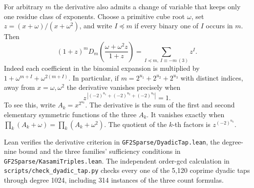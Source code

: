 \documentclass[11pt]{article}
\begin{document}
For arbitrary \(m\) the derivative also admits a change of variable
that keeps only one residue class of exponents. Choose a primitive
cube root \(\omega\), set \(z=(x+\omega)/(x+\omega^2)\), and write
\(I\preceq m\) if every binary one of \(I\) occurs in \(m\). Then
\[
 (1+z)^m D_m\!\left(\frac{\omega+\omega^2z}{1+z}\right)
      =\sum_{I\preceq m,\ I\equiv-m\ (3)} z^I .
\]
Indeed each coefficient in the binomial expansion is multiplied by
\(1+\omega^{m+I}+\omega^{2(m+I)}\). In particular, if
\(m=2^{u_1}+2^{u_2}+2^{u_3}\) with distinct indices, away from
\(x=\omega,\omega^2\) the derivative vanishes precisely when
\[
                z^{\,|(-2)^{u_1}+(-2)^{u_2}+(-2)^{u_3}|}=1 .
\]
To see this, write \(A_k=x^{2^{u_k}}\).
The derivative is the sum of the first and second elementary symmetric
functions of the three \(A_k\). It vanishes exactly when
\(\prod_k(A_k+\omega)=\prod_k(A_k+\omega^2)\).
The quotient of the \(k\)-th factors is \(z^{(-2)^{u_k}}\).

Lean verifies the derivative criterion in \nolinkurl{GF2Sparse/DyadicTap.lean},
the degree-nine bound and the three families' sufficiency conditions in
\nolinkurl{GF2Sparse/KasamiTriples.lean}. The independent order-gcd
calculation in \nolinkurl{scripts/check_dyadic_tap.py} checks every one
of the 5,120 coprime dyadic taps through degree 1024, including
314 instances of the three count formulas.
\end{document}
